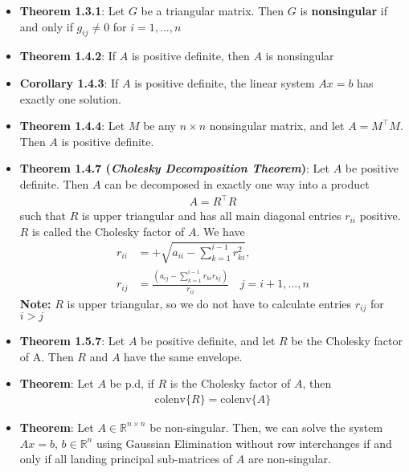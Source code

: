 \documentclass{report}
\begin{document}
\begin{itemize}
\begin{enumerate}[label=(\alph*)]
            \end{enumerate}
        \item \textbf{Theorem 1.3.1}: Let $G$ be a triangular matrix. Then $G$ is \textbf{nonsingular} if and only if
            $g_{ij} \ne 0$ for $i=1,...,n $
        \item \textbf{Theorem 1.4.2}: If $A$ is positive definite, then $A$ is nonsingular
        \item \textbf{Corollary 1.4.3}: If $A$ is positive definite, the linear system $Ax = b$ has exactly one solution.
        \item \textbf{Theorem 1.4.4}: Let $M$ be any $n \times n$ nonsingular matrix, and let $A = M^{\top}M$. Then $A$ is positive definite.
        \item \textbf{Theorem 1.4.7 (\textit{Cholesky Decomposition Theorem})}: Let $A$ be positive definite. Then $A$ can be decomposed in exactly one way into a product
            \begin{align*}
                A = R^{\top}R
            \end{align*}
            such that $R$ is upper triangular and has all main diagonal entries $r_{ii}$ positive. $R$ is called the Cholesky factor of $A$.
            \bigbreak \noindent 
            We have
            \begin{align*}
                r_{ii} &= +\sqrt{a_{ii} - \sum_{k=1}^{i-1}r_{ki}^{2}}, \\
                r_{ij} &= \frac{\left(a_{ij} - \sum_{k=1}^{i-1}r_{ki}r_{kj}\right)}{r_{ii}} \quad j=i+1,...,n
            \end{align*}
            \textbf{Note:} $R$ is upper triangular, so we do not have to calculate entries $r_{ij}$ for $i > j $
        \item \textbf{Theorem 1.5.7}: Let $A$ be positive definite, and let $R$ be the Cholesky factor of A. Then $R$ and $A$ have the same envelope.
        \item \textbf{Theorem}: Let $A$ be p.d, if $R$ is the Cholesky factor of $A$, then
            \begin{align*}
                \text{colenv}\{R\}  = \text{colenv}\{A\}
            \end{align*}
    \item \textbf{Theorem}: Let $A \in \mathbb{R}^{n\times n}$ be non-singular. Then, we can solve the system $Ax = b$, $b \in \mathbb{R}^{n}$ using Gaussian Elimination without row interchanges if and only if all landing principal sub-matrices of $A$ are non-singular.

\end{itemize}
\end{document}
